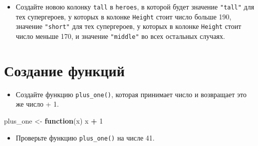 \documentclass[
]{book}
\newenvironment{Shaded}{\begin{snugshade}}{\end{snugshade}}
\newcommand{\CommentTok}[1]{\textcolor[rgb]{0.56,0.35,0.01}{\textit{#1}}}
\newcommand{\ControlFlowTok}[1]{\textcolor[rgb]{0.13,0.29,0.53}{\textbf{#1}}}
\newcommand{\DecValTok}[1]{\textcolor[rgb]{0.00,0.00,0.81}{#1}}
\newcommand{\KeywordTok}[1]{\textcolor[rgb]{0.13,0.29,0.53}{\textbf{#1}}}
\newcommand{\NormalTok}[1]{#1}
\newcommand{\OperatorTok}[1]{\textcolor[rgb]{0.81,0.36,0.00}{\textbf{#1}}}
\newcommand{\StringTok}[1]{\textcolor[rgb]{0.31,0.60,0.02}{#1}}
\providecommand{\tightlist}{%
  \setlength{\itemsep}{0pt}\setlength{\parskip}{0pt}}
\begin{document}
\begin{itemize}
\tightlist
\item
  Создайте новою колонку \texttt{tall} в \texttt{heroes}, в которой будет значение \texttt{"tall"} для тех супергероев, у которых в колонке \texttt{Height} стоит число больше 190, значение \texttt{"short"} для тех супергероев, у которых в колонке \texttt{Height} стоит число меньше 170, и значение \texttt{"middle"} во всех остальных случаях.
\end{itemize}

\begin{Shaded}
\end{Shaded}

\hypertarget{solution_function}{%
\section{Создание функций}\label{solution_function}}

\begin{itemize}
\tightlist
\item
  Создайте функцию \texttt{plus\_one()}, которая принимает число и возвращает это же число + 1.
\end{itemize}

\begin{Shaded}
\begin{Highlighting}[]
\NormalTok{plus_one <-}\StringTok{ }\ControlFlowTok{function}\NormalTok{(x) x }\OperatorTok{+}\StringTok{ }\DecValTok{1}
\end{Highlighting}
\end{Shaded}

\begin{itemize}
\tightlist
\item
  Проверьте функцию \texttt{plus\_one()} на числе 41.
\end{itemize}
\end{document}
